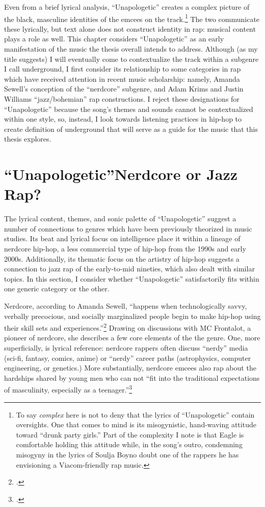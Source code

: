 Even from a brief lyrical analysis, ``Unapologetic'' creates a complex picture of the black,
masculine identities of the emcees on the track.\footnote{
    To say \emph{complex} here is not to deny that the lyrics of ``Unapologetic'' contain
    oversights. One that comes to mind is its misogynistic, hand-waving attitude toward
    ``drunk party girls.'' Part of the complexity I note is that Eagle is comfortable holding
    this attitude while, in the song's outro, condemning misogyny in the lyrics of Soulja
    Boy\textemdash no doubt one of the rappers he has envisioning a Viacom-friendly rap music.} 
The two communicate these lyrically, but text alone does not construct identity in rap: musical
content plays a role as well. This chapter considers ``Unapologetic''  as an early manifestation
of the music the thesis overall intends to address. Although (as my title suggests) I will eventually
come to contextualize the track within a subgenre I call underground, I first consider its relationship
to some categories in rap which have received attention in recent music scholarship: namely, Amanda
Sewell's conception of the ``nerdcore'' subgenre, and Adam Krims  and Justin Williams ``jazz/bohemian'' 
rap  constructions. I reject these designations for  ``Unapologetic'' because the song's themes and 
sounds cannot be contextualized within one style, so, instead, I look towards listening practices 
in hip-hop to create definition of underground that will serve as a guide for the music that this
thesis explores.

\section{``Unapologetic''\textemdash Nerdcore or Jazz Rap?} \label{unapologeticnerdcorejazz}

The lyrical content, themes, and sonic palette of ``Unapologetic'' suggest a number of connections 
to genres which have been previously theorized in music studies. Its beat and lyrical focus on 
intelligence place it within a lineage of nerdcore hip-hop, a less commercial type of hip-hop from
the 1990s and early 2000s. Additionally, its thematic focus on the artistry of hip-hop suggests a
connection to jazz rap of the early-to-mid nineties, which also dealt  with similar topics. In this
section, I consider  whether ``Unapologetic'' satisfactorily fits within one generic category or 
the other.

Nerdcore, according to Amanda Sewell, ``happens when technologically savvy, verbally precocious, and \sloppy
socially marginalized people begin to make hip-hop using their skill sets and 
experiences.''\footnote{
    \autocite[223]{amandasewellNerdcoreHiphop2015}.} 
Drawing on discussions with MC Frontalot, a pioneer of nerdcore, she describes a few core elements
of the  the genre. One, more superficially, is lyrical reference: nerdcore rappers often discuss
``nerdy'' media  (sci-fi, fantasy, comics, anime) or ``nerdy'' career paths (astrophysics, computer
engineering, or genetics.) More substantially, nerdcore emcees also rap about the hardships shared
by young men who can not ``fit into the traditional expectations of masculinity, especially as a 
teenager.''\footnote{
    \autocite[225]{amandasewellNerdcoreHiphop2015}.} 

